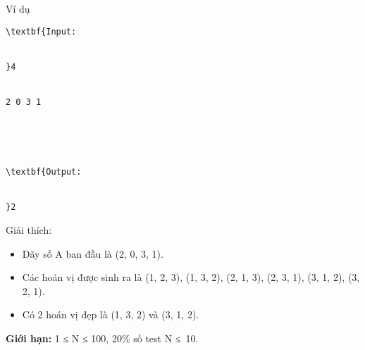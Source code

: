 Ví dụ
\begin{verbatim}
\textbf{Input:


}4


2 0 3 1





\textbf{Output:


}2\end{verbatim}
Giải thích:
\begin{itemize}
	\item     Dãy số A ban đầu là (2, 0, 3, 1).   
	\item     Các hoán vị được sinh ra là (1, 2, 3), (1, 3, 2), (2, 1, 3), (2, 3, 1), (3, 1, 2), (3, 2, 1).   
	\item     Có 2 hoán vị đẹp là (1, 3, 2) và (3, 1, 2).   
\end{itemize}
\textbf{    Giới hạn:   }
1 ≤ N ≤ 100, 20\% số test N ≤ 10.